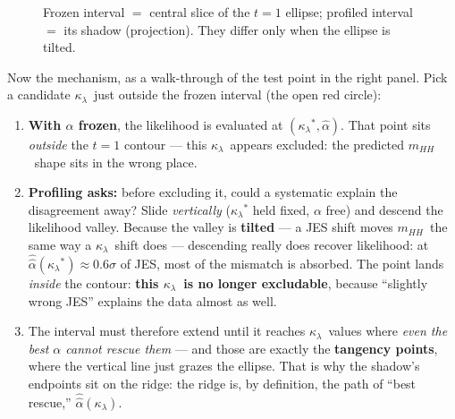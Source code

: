 \documentclass[11pt]{article}
\newcommand{\kl}{\ensuremath{\kappa_\lambda}}
\newcommand{\mhh}{\ensuremath{m_{HH}}}
\newcommand{\ahh}{\ensuremath{\hat{\hat\alpha}}}
\begin{document}
\begin{figure}[htbp]
\caption{Frozen interval $=$ central slice of the $t{=}1$ ellipse; profiled interval $=$ its shadow
(projection). They differ only when the ellipse is tilted.}
\label{fig:slice}
\end{figure}

Now the mechanism, as a walk-through of the test point in the right panel. Pick a candidate \kl\ just outside
the frozen interval (the open red circle):
\begin{enumerate}
\item \textbf{With $\alpha$ frozen}, the likelihood is evaluated at $(\kl^*,\hat\alpha)$. That point sits
  \emph{outside} the $t{=}1$ contour --- this \kl\ appears excluded: the predicted \mhh\ shape sits in the wrong
  place.
\item \textbf{Profiling asks:} before excluding it, could a systematic explain the disagreement away? Slide
  \emph{vertically} ($\kl^*$ held fixed, $\alpha$ free) and descend the likelihood valley. Because the valley
  is \textbf{tilted} --- a JES shift moves \mhh\ the same way a \kl\ shift does --- descending really does
  recover likelihood: at $\ahh(\kl^*)\approx0.6\sigma$ of JES, most of the mismatch is absorbed. The point
  lands \emph{inside} the contour: \textbf{this \kl\ is no longer excludable}, because ``slightly wrong JES''
  explains the data almost as well.
\item The interval must therefore extend until it reaches \kl\ values where \emph{even the best $\alpha$ cannot
  rescue them} --- and those are exactly the \textbf{tangency points}, where the vertical line just grazes the
  ellipse. That is why the shadow's endpoints sit on the ridge: the ridge is, by definition, the path of ``best
  rescue,'' $\ahh(\kl)$.
\end{enumerate}
\end{document}
